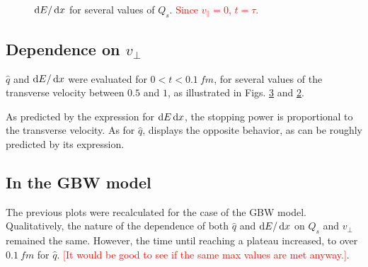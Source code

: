 \begin{figure}
\centering

\caption{$\mathop{}\!\mathrm{d} E / \mathop{}\!\mathrm{d} x$ for several values of $Q_s$. \textcolor{red}{Since $v_\parallel=0$, $t=\tau$.} }
\label{fig:dEdx_sweeping_Q}
\end{figure}


\subsection{Dependence on $v_\perp$}
$\hat{q}$ and $\mathop{}\!\mathrm{d} E / \mathop{}\!\mathrm{d} x$ were evaluated for $0 < t < \qty{0.1}{fm}$, for several values of the transverse velocity between $0.5$ and $1$, as illustrated in Figs. \ref{fig:qHat_sweeping_v} and \ref{fig:dEdx_sweeping_v}. 

As predicted by the expression for $\mathop{}\!\mathrm{d} E \mathop{}\!\mathrm{d} x$, the stopping power is proportional to the transverse velocity. As for $\hat{q}$, displays the opposite behavior, as can be roughly predicted by its expression.
\begin{figure}
\centering

\caption{}
\label{fig:dEdx_sweeping_v}
\end{figure}

\begin{figure}
\centering

\caption{}
\label{fig:qHat_sweeping_v}
\end{figure}

\subsection{In the GBW model}
The previous plots were recalculated for the case of the \gls{GBW} model. Qualitatively, the nature of the dependence of both $\hat{q}$ and $\mathop{}\!\mathrm{d} E /\mathop{}\!\mathrm{d} x$ on $Q_s$ and $v_\perp$ remained the same. However, the time until reaching a plateau increased, to over $\qty{0.1}{fm}$ for $\hat{q}$. \textcolor{red}{[It would be good to see if the same max values are met anyway.]}.
\begin{figure}
\centering

\caption{}
\label{fig:GBW_qHat_sweeping_Q}
\end{figure}

\begin{figure}
\centering

\caption{}
\label{fig:GBW_dEdx_sweeping_Q}
\end{figure}

\begin{figure}
\centering

\caption{}
\label{fig:GBW_qHat_sweeping_v}
\end{figure}

